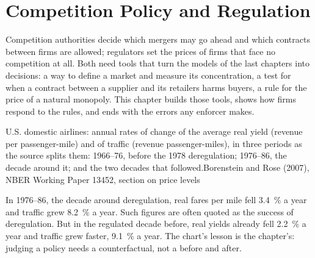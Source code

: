 \chapter{Competition Policy and Regulation}\label{ch:b3:competition-policy}

Competition authorities decide which mergers may go ahead and which contracts
between firms are allowed; regulators set the prices of firms that face no
competition at all. Both need tools that turn the models of the last chapters into
decisions: a way to define a market and measure its concentration, a test for
when a contract between a supplier and its retailers harms buyers, a rule for the
price of a natural monopoly. This chapter builds those tools, shows how firms respond
to the rules, and ends with the errors any enforcer makes.

\begin{openingchart}{U.S. domestic airlines: annual rates of change of the average
real yield (revenue per passenger-mile) and of traffic (revenue passenger-miles), in
three periods as the source splits them: 1966--76, before the 1978 deregulation;
1976--86, the decade around it; and the two decades that followed.}{Borenstein and Rose (2007), NBER Working Paper 13452, section on
price levels}
\end{openingchart}

In 1976--86, the decade around deregulation, real fares per mile fell 3.4~\% a year and traffic grew
8.2~\% a year. Such figures are often quoted as the success of deregulation. But in the
regulated decade before, real yields already fell 2.2~\% a year and traffic grew faster,
9.1~\% a year. The chart's lesson is the chapter's: judging a policy needs a
counterfactual, not a before and after.

